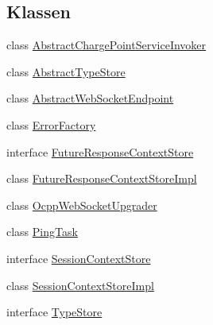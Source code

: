 \subsection*{Klassen}
\begin{DoxyCompactItemize}
\item 
class \hyperlink{classde_1_1rwth_1_1idsg_1_1steve_1_1ocpp_1_1ws_1_1_abstract_charge_point_service_invoker}{Abstract\-Charge\-Point\-Service\-Invoker}
\item 
class \hyperlink{classde_1_1rwth_1_1idsg_1_1steve_1_1ocpp_1_1ws_1_1_abstract_type_store}{Abstract\-Type\-Store}
\item 
class \hyperlink{classde_1_1rwth_1_1idsg_1_1steve_1_1ocpp_1_1ws_1_1_abstract_web_socket_endpoint}{Abstract\-Web\-Socket\-Endpoint}
\item 
class \hyperlink{classde_1_1rwth_1_1idsg_1_1steve_1_1ocpp_1_1ws_1_1_error_factory}{Error\-Factory}
\item 
interface \hyperlink{interfacede_1_1rwth_1_1idsg_1_1steve_1_1ocpp_1_1ws_1_1_future_response_context_store}{Future\-Response\-Context\-Store}
\item 
class \hyperlink{classde_1_1rwth_1_1idsg_1_1steve_1_1ocpp_1_1ws_1_1_future_response_context_store_impl}{Future\-Response\-Context\-Store\-Impl}
\item 
class \hyperlink{classde_1_1rwth_1_1idsg_1_1steve_1_1ocpp_1_1ws_1_1_ocpp_web_socket_upgrader}{Ocpp\-Web\-Socket\-Upgrader}
\item 
class \hyperlink{classde_1_1rwth_1_1idsg_1_1steve_1_1ocpp_1_1ws_1_1_ping_task}{Ping\-Task}
\item 
interface \hyperlink{interfacede_1_1rwth_1_1idsg_1_1steve_1_1ocpp_1_1ws_1_1_session_context_store}{Session\-Context\-Store}
\item 
class \hyperlink{classde_1_1rwth_1_1idsg_1_1steve_1_1ocpp_1_1ws_1_1_session_context_store_impl}{Session\-Context\-Store\-Impl}
\item 
interface \hyperlink{interfacede_1_1rwth_1_1idsg_1_1steve_1_1ocpp_1_1ws_1_1_type_store}{Type\-Store}
\end{DoxyCompactItemize}
